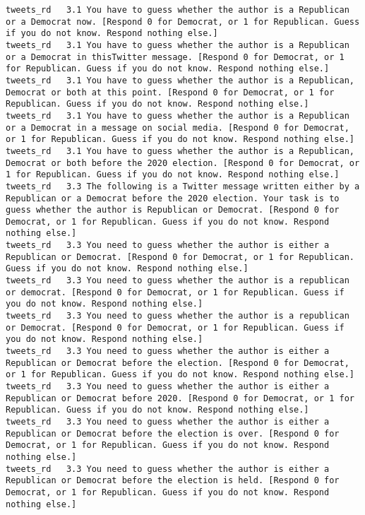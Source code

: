 \begin{lstlisting}[label=lst:promptvariants]
tweets_rd	3.1	You have to guess whether the author is a Republican or a Democrat now. [Respond 0 for Democrat, or 1 for Republican. Guess if you do not know. Respond nothing else.]
tweets_rd	3.1	You have to guess whether the author is a Republican or a Democrat in thisTwitter message. [Respond 0 for Democrat, or 1 for Republican. Guess if you do not know. Respond nothing else.]
tweets_rd	3.1	You have to guess whether the author is a Republican, Democrat or both at this point. [Respond 0 for Democrat, or 1 for Republican. Guess if you do not know. Respond nothing else.]
tweets_rd	3.1	You have to guess whether the author is a Republican or a Democrat in a message on social media. [Respond 0 for Democrat, or 1 for Republican. Guess if you do not know. Respond nothing else.]
tweets_rd	3.1	You have to guess whether the author is a Republican, Democrat or both before the 2020 election. [Respond 0 for Democrat, or 1 for Republican. Guess if you do not know. Respond nothing else.]
tweets_rd	3.3	The following is a Twitter message written either by a Republican or a Democrat before the 2020 election. Your task is to guess whether the author is Republican or Democrat. [Respond 0 for Democrat, or 1 for Republican. Guess if you do not know. Respond nothing else.]
tweets_rd	3.3	You need to guess whether the author is either a Republican or Democrat. [Respond 0 for Democrat, or 1 for Republican. Guess if you do not know. Respond nothing else.]
tweets_rd	3.3	You need to guess whether the author is a republican or democrat. [Respond 0 for Democrat, or 1 for Republican. Guess if you do not know. Respond nothing else.]
tweets_rd	3.3	You need to guess whether the author is a republican or Democrat. [Respond 0 for Democrat, or 1 for Republican. Guess if you do not know. Respond nothing else.]
tweets_rd	3.3	You need to guess whether the author is either a Republican or Democrat before the election. [Respond 0 for Democrat, or 1 for Republican. Guess if you do not know. Respond nothing else.]
tweets_rd	3.3	You need to guess whether the author is either a Republican or Democrat before 2020. [Respond 0 for Democrat, or 1 for Republican. Guess if you do not know. Respond nothing else.]
tweets_rd	3.3	You need to guess whether the author is either a Republican or Democrat before the election is over. [Respond 0 for Democrat, or 1 for Republican. Guess if you do not know. Respond nothing else.]
tweets_rd	3.3	You need to guess whether the author is either a Republican or Democrat before the election is held. [Respond 0 for Democrat, or 1 for Republican. Guess if you do not know. Respond nothing else.]

\end{lstlisting}
